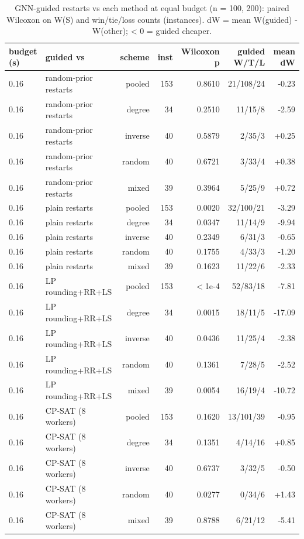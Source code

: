 \begin{table}[t]
\centering
\caption{GNN-guided restarts vs each method at equal budget (n = 100, 200): paired Wilcoxon on W(S) and win/tie/loss counts (instances). dW = mean W(guided) - W(other); < 0 = guided cheaper.}
\label{tab:rev2_step1_tests}
\scriptsize
\begin{tabular}{llrrrrr}
\toprule
budget (s) & guided vs & scheme & inst & Wilcoxon p & guided W/T/L & mean dW \\
\midrule
0.16 & random-prior restarts & pooled & 153 & 0.8610 & 21/108/24 & -0.23 \\
0.16 & random-prior restarts & degree & 34 & 0.2510 & 11/15/8 & -2.59 \\
0.16 & random-prior restarts & inverse & 40 & 0.5879 & 2/35/3 & +0.25 \\
0.16 & random-prior restarts & random & 40 & 0.6721 & 3/33/4 & +0.38 \\
0.16 & random-prior restarts & mixed & 39 & 0.3964 & 5/25/9 & +0.72 \\
0.16 & plain restarts & pooled & 153 & 0.0020 & 32/100/21 & -3.29 \\
0.16 & plain restarts & degree & 34 & 0.0347 & 11/14/9 & -9.94 \\
0.16 & plain restarts & inverse & 40 & 0.2349 & 6/31/3 & -0.65 \\
0.16 & plain restarts & random & 40 & 0.1755 & 4/33/3 & -1.20 \\
0.16 & plain restarts & mixed & 39 & 0.1623 & 11/22/6 & -2.33 \\
0.16 & LP rounding+RR+LS & pooled & 153 & $<$1e-4 & 52/83/18 & -7.81 \\
0.16 & LP rounding+RR+LS & degree & 34 & 0.0015 & 18/11/5 & -17.09 \\
0.16 & LP rounding+RR+LS & inverse & 40 & 0.0436 & 11/25/4 & -2.38 \\
0.16 & LP rounding+RR+LS & random & 40 & 0.1361 & 7/28/5 & -2.52 \\
0.16 & LP rounding+RR+LS & mixed & 39 & 0.0054 & 16/19/4 & -10.72 \\
0.16 & CP-SAT (8 workers) & pooled & 153 & 0.1620 & 13/101/39 & -0.95 \\
0.16 & CP-SAT (8 workers) & degree & 34 & 0.1351 & 4/14/16 & +0.85 \\
0.16 & CP-SAT (8 workers) & inverse & 40 & 0.6737 & 3/32/5 & -0.50 \\
0.16 & CP-SAT (8 workers) & random & 40 & 0.0277 & 0/34/6 & +1.43 \\
0.16 & CP-SAT (8 workers) & mixed & 39 & 0.8788 & 6/21/12 & -5.41 \\

\end{tabular}
\end{table}
